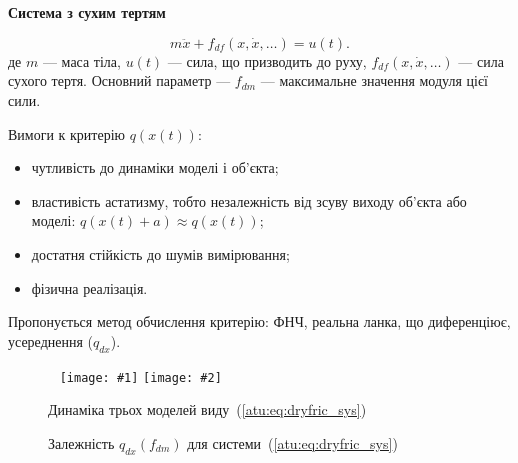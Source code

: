 \documentclass[14pt,handout,utf8]{beamer}
\newlength\DDP
\newcommand{\Xhead}[1]{
 \begin{center}%
      \textbf{#1}%
 \end{center}%
}
\newcommand{\PicDoubleNL}[2]{%
 \begin{center}
    ~ \hfill
    \texttt{[image: \#1]}
    \hfill
    \texttt{[image: \#2]}
    \hfill ~
  \end{center}
}
\begin{document}

\begin{frame}
  \frametitle{~}

  \Xhead{Система з сухим тертям}

  \begin{equation}
    m \ddot{x} + f_{df}( x, \dot{x}, \ldots)  = u(t).
    \label{atu:eq:dryfric_sys}
  \end{equation}
  де
  $m$ --- маса тіла,
  $u(t)$ --- сила, що призводить до руху,
  $f_{df}(x, \dot{x}, \ldots)$ ---  сила сухого тертя.
  Основний параметр --- $f_{dm}$ --- максимальне значення модуля цієї сили.

  Вимоги к  критерію $q(x(t))$:

  \begin{itemize}

    \item
      чутливість до динаміки моделі і об'єкта;

    \item
      властивість астатизму,
      тобто незалежність від зсуву виходу об'єкта або моделі:
      \( q(x(t)+a ) \approx q( x(t) ) \);

    \item
      достатня стійкість до шумів вимірювання;

    \item
      фізична реалізація.

  \end{itemize}

  Пропонується метод обчислення критерію: ФНЧ, реальна ланка, що диференціює,
  усереднення ($q_{dx}$).

  \begin{figure}[htb!]
    \PicDoubleNL{../p5/p/cha/fric/fric_outs1.png}{../p5/p/cha/fric/fric_q-p_f_dm_q.png}
    \parbox[t]{\DDP} {
      \caption{Динаміка трьох моделей виду~(\ref{atu:eq:dryfric_sys})}
      \label{atu:f:fric_outs}
    }
    \hfill
    \parbox[t]{\DDP} {
      \caption{Залежність $q_{dx}(f_{dm})$ для системи~(\ref{atu:eq:dryfric_sys}) }
      \label{atu:f:fric_q}
    }
  \end{figure}


\end{frame}



\end{document}
